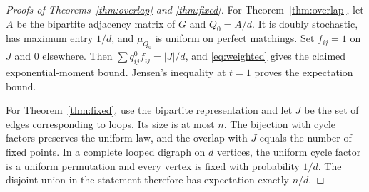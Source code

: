 \documentclass[11pt]{article}
\begin{document}
\begin{proof}[Proofs of Theorems~\ref{thm:overlap} and \ref{thm:fixed}]
For Theorem~\ref{thm:overlap}, let \(A\) be the bipartite adjacency matrix of \(G\) and \(Q_0=A/d\). It is doubly stochastic, has maximum entry \(1/d\), and \(\mu_{Q_0}\) is uniform on perfect matchings. Set \(f_{ij}=1\) on \(J\) and \(0\) elsewhere. Then \(\sum q^0_{ij}f_{ij}=|J|/d\), and \eqref{eq:weighted} gives the claimed exponential-moment bound. Jensen's inequality at \(t=1\) proves the expectation bound.

For Theorem~\ref{thm:fixed}, use the bipartite representation and let \(J\) be the set of edges corresponding to loops. Its size is at most \(n\). The bijection with cycle factors preserves the uniform law, and the overlap with \(J\) equals the number of fixed points. In a complete looped digraph on \(d\) vertices, the uniform cycle factor is a uniform permutation and every vertex is fixed with probability \(1/d\). The disjoint union in the statement therefore has expectation exactly \(n/d\).
\end{proof}
\end{document}
